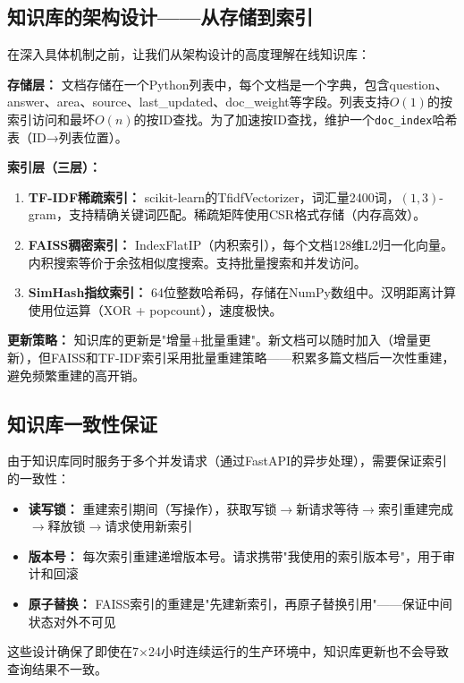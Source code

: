 \documentclass[11pt,a4paper]{ctexart}
\begin{document}
\subsection{知识库的架构设计——从存储到索引}

在深入具体机制之前，让我们从架构设计的高度理解在线知识库：

\textbf{存储层：} 文档存储在一个Python列表中，每个文档是一个字典，包含question、answer、area、source、last\_updated、doc\_weight等字段。列表支持$O(1)$的按索引访问和最坏$O(n)$的按ID查找。为了加速按ID查找，维护一个\texttt{doc\_index}哈希表（ID→列表位置）。

\textbf{索引层（三层）：}
\begin{enumerate}[nosep]
\item \textbf{TF-IDF稀疏索引：} scikit-learn的TfidfVectorizer，词汇量2400词，$(1,3)$-gram，支持精确关键词匹配。稀疏矩阵使用CSR格式存储（内存高效）。
\item \textbf{FAISS稠密索引：} IndexFlatIP（内积索引），每个文档128维L2归一化向量。内积搜索等价于余弦相似度搜索。支持批量搜索和并发访问。
\item \textbf{SimHash指纹索引：} 64位整数哈希码，存储在NumPy数组中。汉明距离计算使用位运算（XOR + popcount），速度极快。
\end{enumerate}

\textbf{更新策略：} 知识库的更新是"增量+批量重建"。新文档可以随时加入（增量更新），但FAISS和TF-IDF索引采用批量重建策略——积累多篇文档后一次性重建，避免频繁重建的高开销。

\subsection{知识库一致性保证}

由于知识库同时服务于多个并发请求（通过FastAPI的异步处理），需要保证索引的一致性：

\begin{itemize}[nosep]
\item \textbf{读写锁：} 重建索引期间（写操作），获取写锁$\to$新请求等待$\to$索引重建完成$\to$释放锁$\to$请求使用新索引
\item \textbf{版本号：} 每次索引重建递增版本号。请求携带"我使用的索引版本号"，用于审计和回滚
\item \textbf{原子替换：} FAISS索引的重建是"先建新索引，再原子替换引用"——保证中间状态对外不可见
\end{itemize}

这些设计确保了即使在7×24小时连续运行的生产环境中，知识库更新也不会导致查询结果不一致。
\end{document}
